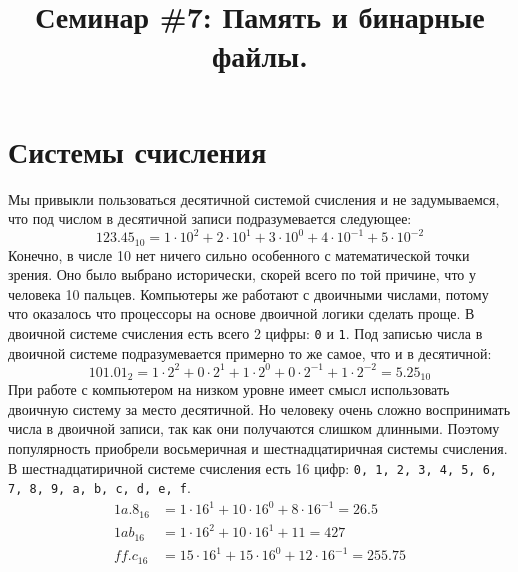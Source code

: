 \documentclass[10pt]{article}
\begin{document}
\title{Семинар \#7: Память и бинарные файлы.\vspace{-5ex}}\date{}\maketitle

\section*{Системы счисления}
Мы привыкли пользоваться десятичной системой счисления и не задумываемся, что под числом в десятичной записи подразумевается следующее:
$$
123.45_{10} = 1 \cdot 10^2 + 2 \cdot 10^1 + 3 \cdot 10^0 + 4 \cdot 10^{-1} + 5 \cdot 10^{-2}
$$
Конечно, в числе 10 нет ничего сильно особенного с математической точки зрения. Оно было выбрано исторически, скорей всего по той причине, что у человека 10 пальцев. Компьютеры же работают с двоичными числами, потому что оказалось что процессоры на основе двоичной логики сделать проще. В двоичной системе счисления есть всего 2 цифры: \texttt{0} и \texttt{1}. Под записью числа в двоичной системе подразумевается примерно то же самое, что и в десятичной:
$$
101.01_2 = 1 \cdot 2^2 + 0 \cdot 2^1 + 1 \cdot 2^0 + 0 \cdot 2^{-1} + 1 \cdot 2^{-2} = 5.25_{10}
$$
При работе с компьютером на низком уровне имеет смысл использовать двоичную систему за место десятичной.  Но человеку очень сложно воспринимать числа в двоичной записи, так как они получаются слишком длинными. Поэтому популярность приобрели восьмеричная и шестнадцатиричная системы счисления. В шестнадцатиричной системе счисления есть 16 цифр: \texttt{0, 1, 2, 3, 4, 5, 6, 7, 8, 9, a, b, c, d, e, f}.
\begin{align*}
1a.8_{16} &= 1 \cdot 16^1 + 10 \cdot 16^0 + 8 \cdot 16^{-1} = 26.5\\
1ab_{16}  &= 1 \cdot 16^2 + 10 \cdot 16^1 + 11 = 427\\
ff.c_{16} &= 15 \cdot 16^ 1 + 15 \cdot 16^0 + 12 \cdot 16^{-1} = 255.75
\end{align*}
\end{document}
